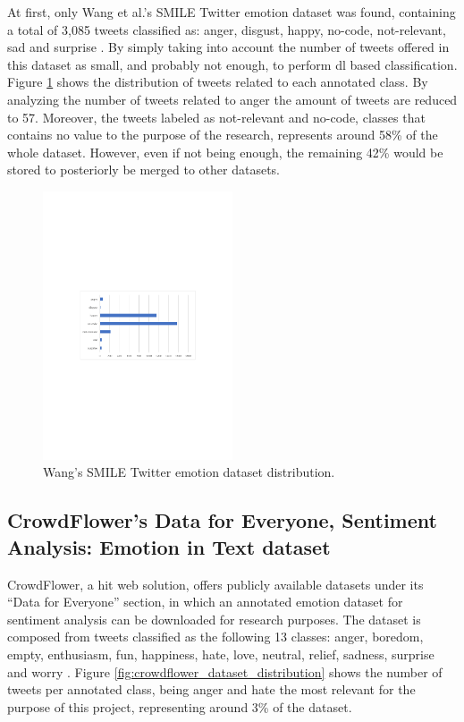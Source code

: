 At first, only Wang et al.'s SMILE Twitter emotion dataset was found, containing a total of 3,085 tweets classified as: anger, disgust, happy, no-code, not-relevant, sad and surprise \cite{wang2016smile}. By simply taking into account the number of tweets offered in this dataset as small, and probably not enough, to perform \acrshort{dl} based classification. Figure \ref{fig:smile_dataset_distribution} shows the distribution of tweets related to each annotated class. By analyzing the number of tweets related to anger the amount of tweets are reduced to 57. Moreover, the tweets labeled as not-relevant and no-code, classes that contains no value to the purpose of the research, represents around 58\% of the whole dataset. However, even if not being enough, the remaining 42\% would be stored to posteriorly be merged to other datasets.

\begin{figure}[!htp]
  \center
  \includegraphics[width=0.5\textwidth]{figures/SMILE_dataset_distribution}
  \caption{Wang's SMILE Twitter emotion dataset distribution.}
  \label{fig:smile_dataset_distribution}
\end{figure}

\subsection{CrowdFlower's Data for Everyone, Sentiment Analysis: Emotion in Text dataset}

CrowdFlower, a \acrshort{hit} web solution, offers publicly available datasets under its ``Data for Everyone'' section, in which an annotated emotion dataset for sentiment analysis can be downloaded for research purposes. The dataset is composed from tweets classified as the following 13 classes: anger, boredom, empty, enthusiasm, fun, happiness, hate, love, neutral, relief, sadness, surprise and worry \cite{CrowdFlowerDfE}. Figure \ref{fig:crowdflower_dataset_distribution} shows the number of tweets per annotated class, being anger and hate the most relevant for the purpose of this project, representing around 3\% of the dataset.

